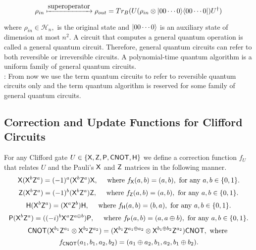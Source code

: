 $$\rho_{in} \xmapsto{\mbox{superoperator}} \rho_{out}=Tr_B(U(\rho_{in} \otimes {\lvert}00\cdots 0\rangle {\langle}00\cdots 0\rvert)U^\dagger)$$

where $\rho_{in} \in \mathcal{H}_n,$ is the original state and ${\lvert}00\cdots 0\rangle$ is an auxiliary state of dimension at most $n^2.$ A circuit that computes a general quantum operation is called a general quantum circuit.  Therefore, general quantum circuits can refer to both reversible or irreversible circuits. A polynomial-time quantum algorithm is a uniform family of general quantum circuits. \\

: From now we use the term  quantum circuits to refer to reversible quantum circuits only and the term quantum algorithm is reserved for some family of general quantum circuits. 


\subsection{Correction and Update Functions for Clifford Circuits}
\label{correction function}
For any Clifford gate $U\in \{{\sf X}, {\sf Z}, {\sf P}, {\sf CNOT},{\sf H}\}$ we define a correction function $f_U$ that relates  $U$ and the Pauli's $ {\sf X}$ and $ {\sf Z}$ matrices in the following manner.
$${\sf X}({\sf X}^b{\sf Z}^a)=(-1)^a({\sf X}^{b}{\sf Z}^{a}) {\sf X},\quad \mbox{ where }f_{\sf X}(a,b)=(a,b), \mbox{ for any } a, b\in\{0,1\}.$$
$${\sf Z}({\sf X}^b{\sf Z}^a)=(-1)^b({\sf X}^{b}{\sf Z}^{a}) {\sf Z},\quad \mbox{ where }f_{\sf Z}(a,b)=(a,b), \mbox{ for any } a, b\in\{0,1\}.$$
$${\sf H}({\sf X}^b{\sf Z}^a)=({\sf X}^{a}{\sf Z}^{b}) {\sf H},\quad \mbox{ where }f_{\sf H}(a,b)=(b,a), \mbox{ for any } a, b\in\{0,1\}.$$
$$ {\sf P}({\sf X}^b{\sf Z}^a)=((-i)^b{\sf X}^a{\sf Z}^{a\oplus b}) {\sf P}, \quad \mbox{ where }f_ {\sf P}(a,b)=(a,a\oplus b), \mbox{ for any } a, b\in\{0,1\}.$$
$${\sf CNOT} ({\sf X}^{b_1}{\sf Z}^{a_1} \otimes {\sf X}^{b_2}{\sf Z}^{a_2})=({{\sf X}^{b_1} {{\sf Z}^{a_1\oplus a_2}}} \otimes {{\sf X}^{b_1\oplus b_2}}{\sf Z}^{a_2}){\sf CNOT}, \mbox{ where }$$ $$f_{{\sf CNOT}}(a_1,b_1,a_2,b_2)=(a_1\oplus a_2,b_1,a_2, b_1\oplus b_2).$$

